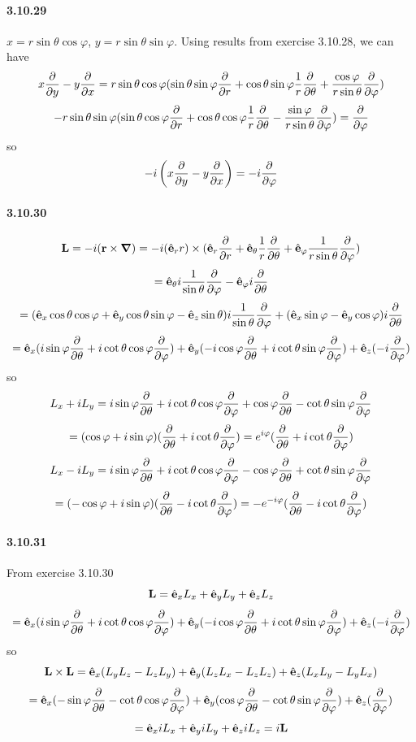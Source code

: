 \documentclass[a4paper]{article}
\begin{document}
\paragraph{3.10.29}
$x=r\sin\theta\cos\varphi$, $y=r\sin\theta\sin\varphi$. Using results from exercise 3.10.28, we can have
\[
x\pdv{}{y}-y\pdv{}{x}=r\sin\theta\cos\varphi(\sin\theta\sin\varphi\pdv{}{r}+\cos\theta\sin\varphi\frac{1}{r}\pdv{}{\theta}+\frac{\cos\varphi}{r\sin\theta}\pdv{}{\varphi})\]
\[-r\sin\theta\sin\varphi(\sin\theta\cos\varphi\pdv{}{r}+\cos\theta\cos\varphi\frac{1}{r}\pdv{}{\theta}-\frac{\sin\varphi}{r\sin\theta}\pdv{}{\varphi})
=\pdv{}{\varphi}
\]
so 
\[-i\left(x\pdv{}{y}-y\pdv{}{x}\right)=-i\pdv{}{\varphi}\]

\paragraph{3.10.30}
\[
\V{L}=-i(\V{r}\times\del)=-i(\VE_r r)\times(\VE_r\pdv{}{r}+\VE_\theta\frac{1}{r}\pdv{}{\theta}+\VE_\varphi\frac{1}{r\sin\theta}\pdv{}{\varphi})
\]
\[
=\VE_\theta i\frac{1}{\sin\theta}\pdv{}{\varphi}-\VE_\varphi i\pdv{}{\theta}
\]
\[
=(\VE_x\cos\theta\cos\varphi+\VE_y\cos\theta\sin\varphi-\VE_z\sin\theta)i\frac{1}{\sin\theta}\pdv{}{\varphi}+(\VE_x\sin\varphi-\VE_y\cos\varphi)i\pdv{}{\theta}
\]
\[
=\VE_x(i\sin\varphi\pdv{}{\theta}+i\cot\theta\cos\varphi\pdv{}{\varphi})+\VE_y(-i\cos\varphi\pdv{}{\theta}+i\cot\theta\sin\varphi\pdv{}{\varphi})+\VE_z(-i\pdv{}{\varphi})
\]
so
\[
L_x+iL_y=i\sin\varphi\pdv{}{\theta}+i\cot\theta\cos\varphi\pdv{}{\varphi}+\cos\varphi\pdv{}{\theta}-\cot\theta\sin\varphi\pdv{}{\varphi}
\]
\[
=(\cos\varphi+i\sin\varphi)(\pdv{}{\theta}+i\cot\theta\pdv{}{\varphi})=e^{i\varphi}(\pdv{}{\theta}+i\cot\theta\pdv{}{\varphi})
\]
\[
L_x-iL_y=i\sin\varphi\pdv{}{\theta}+i\cot\theta\cos\varphi\pdv{}{\varphi}-\cos\varphi\pdv{}{\theta}+\cot\theta\sin\varphi\pdv{}{\varphi}
\]
\[
=(-\cos\varphi+i\sin\varphi)(\pdv{}{\theta}-i\cot\theta\pdv{}{\varphi})=-e^{-i\varphi}(\pdv{}{\theta}-i\cot\theta\pdv{}{\varphi})
\]

\paragraph{3.10.31}
From exercise 3.10.30
\[
\V{L}=\VE_xL_x+\VE_yL_y+\VE_zL_z\]
\[=\VE_x(i\sin\varphi\pdv{}{\theta}+i\cot\theta\cos\varphi\pdv{}{\varphi})+\VE_y(-i\cos\varphi\pdv{}{\theta}+i\cot\theta\sin\varphi\pdv{}{\varphi})+\VE_z(-i\pdv{}{\varphi})
\]
so 
\[
\V{L}\times\V{L}=\VE_x(L_yL_z-L_zL_y)+\VE_y(L_zL_x-L_zL_z)+\VE_z(L_xL_y-L_yL_x)
\]
\[
=\VE_x(-\sin\varphi\pdv{}{\theta}-\cot\theta\cos\varphi\pdv{}{\varphi})+\VE_y(\cos\varphi\pdv{}{\theta}-\cot\theta\sin\varphi\pdv{}{\varphi})+\VE_z(\pdv{}{\varphi})
\]
\[
=\VE_xiL_x+\VE_yiL_y+\VE_ziL_z=i\V{L}
\]
\end{document}
